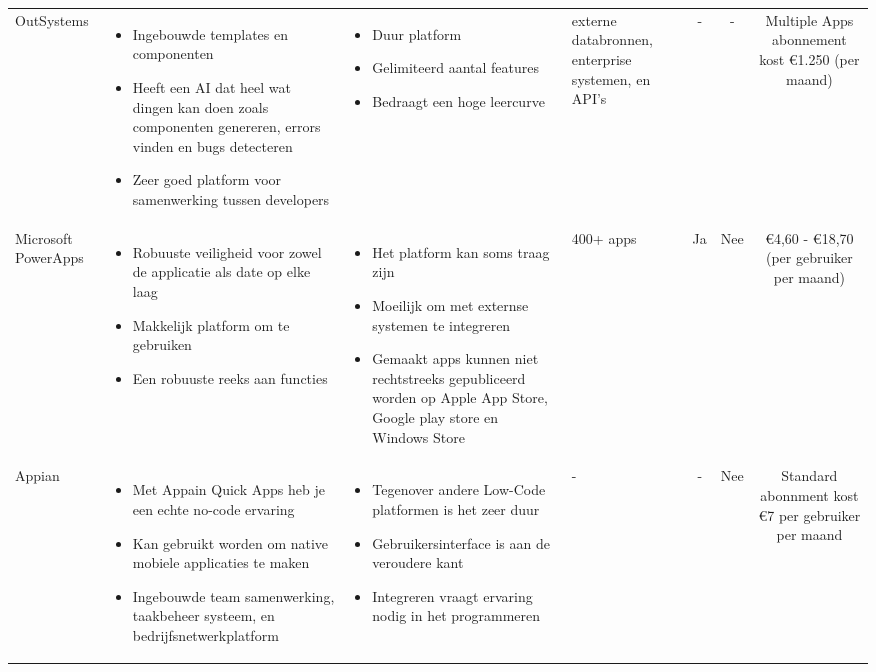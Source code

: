 \begin{longtable}{p{2.2cm} p{4.4cm} p{3.4cm} p{2.2cm} c c c}
    OutSystems & 
    \begin{itemize}
        \item Ingebouwde templates en componenten
        \item Heeft een AI dat heel wat dingen kan doen zoals componenten genereren, errors vinden en bugs detecteren 
        \item Zeer goed platform voor samenwerking tussen developers
    \end{itemize} & 
    \begin{itemize}
        \item  Duur platform
        \item  Gelimiteerd aantal features
        \item  Bedraagt een hoge leercurve
    \end{itemize} &
    externe databronnen, enterprise systemen, en API's &
    - &
    - &
    Multiple Apps abonnement kost €1.250 (per maand)\\

    Microsoft PowerApps & 
    \begin{itemize}
        \item Robuuste veiligheid voor zowel de applicatie als date op elke laag
        \item Makkelijk platform om te gebruiken
        \item Een robuuste reeks aan functies
    \end{itemize} & 
    \begin{itemize}
        \item Het platform kan soms traag zijn
        \item Moeilijk om met externse systemen te integreren
        \item Gemaakt apps kunnen niet rechtstreeks gepubliceerd worden op Apple App Store, Google play store en Windows Store
    \end{itemize} &
    400+ apps &
    Ja &
    Nee &
    €4,60 - €18,70 (per gebruiker per maand)\\


    Appian & 
    \begin{itemize}
        \item Met Appain Quick Apps heb je een echte no-code ervaring
        \item Kan gebruikt worden om native mobiele applicaties te maken
        \item Ingebouwde team samenwerking, taakbeheer systeem, en bedrijfsnetwerkplatform
    \end{itemize} & 
    \begin{itemize}
        \item Tegenover andere Low-Code platformen is het zeer duur
        \item Gebruikersinterface is aan de veroudere kant 
        \item Integreren vraagt ervaring nodig in het programmeren
    \end{itemize} &
    - &
    - &
    Nee &
    Standard abonnment kost €7 per gebruiker per maand\\


\end{longtable}
